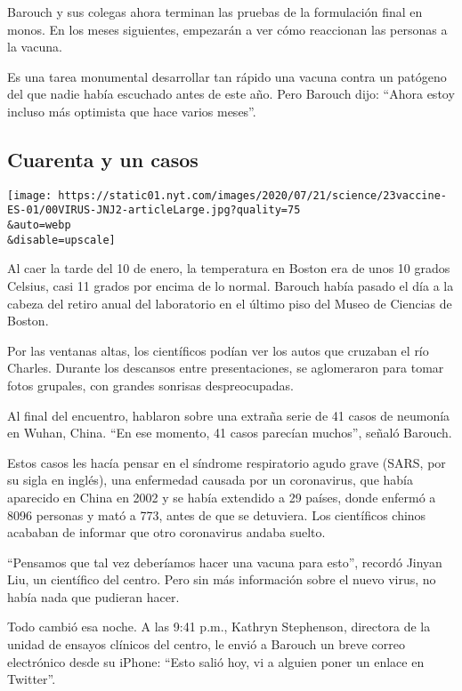 Barouch y sus colegas ahora terminan las pruebas de la formulación final
en monos. En los meses siguientes, empezarán a ver cómo reaccionan las
personas a la vacuna.

Es una tarea monumental desarrollar tan rápido una vacuna contra un
patógeno del que nadie había escuchado antes de este año. Pero Barouch
dijo: ``Ahora estoy incluso más optimista que hace varios meses''.

\hypertarget{cuarenta-y-un-casos}{%
\subsection{Cuarenta y un casos}\label{cuarenta-y-un-casos}}

\texttt{[image: https://static01.nyt.com/images/2020/07/21/science/23vaccine-ES-01/00VIRUS-JNJ2-articleLarge.jpg?quality=75\\\&auto=webp\\\&disable=upscale]}

Al caer la tarde del 10 de enero, la temperatura en Boston era de unos
10 grados Celsius, casi 11 grados por encima de lo normal. Barouch había
pasado el día a la cabeza del retiro anual del laboratorio en el último
piso del Museo de Ciencias de Boston.

Por las ventanas altas, los científicos podían ver los autos que
cruzaban el río Charles. Durante los descansos entre presentaciones, se
aglomeraron para tomar fotos grupales, con grandes sonrisas
despreocupadas.

Al final del encuentro, hablaron sobre una extraña serie de 41 casos de
neumonía en Wuhan, China. ``En ese momento, 41 casos parecían muchos'',
señaló Barouch.

Estos casos les hacía pensar en el síndrome respiratorio agudo grave
(SARS, por su sigla en inglés), una enfermedad causada por un
coronavirus, que había aparecido en China en 2002 y se había extendido a
29 países, donde enfermó a 8096 personas y mató a 773, antes de que se
detuviera. Los científicos chinos acababan de informar que otro
coronavirus andaba suelto.

``Pensamos que tal vez deberíamos hacer una vacuna para esto'', recordó
Jinyan Liu, un científico del centro. Pero sin más información sobre el
nuevo virus, no había nada que pudieran hacer.

Todo cambió esa noche. A las 9:41 p.m., Kathryn Stephenson, directora de
la unidad de ensayos clínicos del centro, le envió a Barouch un breve
correo electrónico desde su iPhone: ``Esto salió hoy, vi a alguien poner
un enlace en Twitter''.

